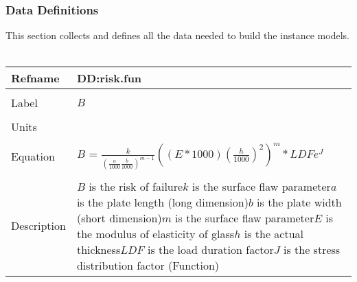 \documentclass[12pt]{article}
\begin{document}
\subsubsection{Data Definitions}
\label{Sec:DataDefi}
This section collects and defines all the data needed to build the instance models.
~\newline
\noindent \begin{minipage}{\textwidth}
\begin{tabular}{p{} p{}}
\toprule \textbf{Refname} & \textbf{DD:risk.fun}
\label{DD:risk.fun}
\\ \midrule \\
Label & $B$
\\ \midrule \\
Units & 
\\ \midrule \\
Equation & $B$ = $\frac{k}{(\frac{a}{1000}\frac{b}{1000})^{m-1}}((E*1000)(\frac{h}{1000})^{2})^{m}*LDFe^{J}$
\\ \midrule \\
Description & $B$ is the risk of failure\newline$k$ is the surface flaw parameter\newline$a$ is the plate length (long dimension)\newline$b$ is the plate width (short dimension)\newline$m$ is the surface flaw parameter\newline$E$ is the modulus of elasticity of glass\newline$h$ is the actual thickness\newline$LDF$ is the load duration factor\newline$J$ is the stress distribution factor (Function)
\\ \bottomrule \end{tabular}
\end{minipage}\\
~\newline
\end{document}
